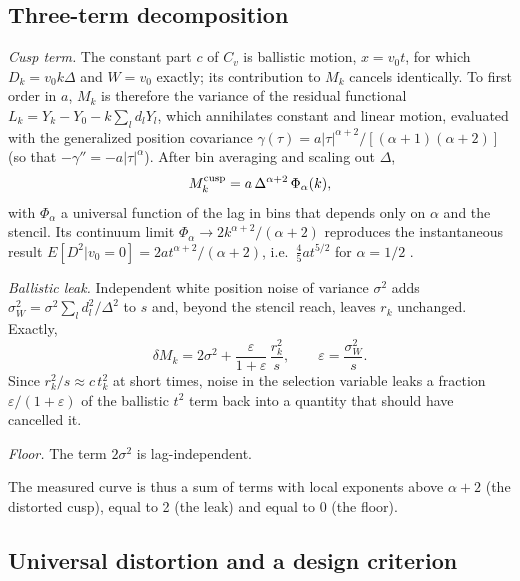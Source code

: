 \documentclass[aps,pre,10pt,twocolumn,superscriptaddress,amsmath,amssymb]{revtex4-2}
\begin{document}
\subsection{Three-term decomposition}

\emph{Cusp term.} The constant part $c$ of $C_v$ is ballistic motion, $x=v_0t$, for which $D_k=v_0k\Delta$ and $W=v_0$ exactly; its contribution to $M_k$ cancels identically. To first order in $a$, $M_k$ is therefore the variance of the residual functional $L_k=Y_k-Y_0-k\sum_l d_lY_l$, which annihilates constant and linear motion, evaluated with the generalized position covariance $\gamma(\tau)=a|\tau|^{\alpha+2}/[(\alpha+1)(\alpha+2)]$ (so that $-\gamma''=-a|\tau|^\alpha$). After bin averaging and scaling out $\Delta$,
\begin{equation}
M_k^{\rm cusp}=a\,\Delta^{\alpha+2}\,\Phi_\alpha(k),
\end{equation}
with $\Phi_\alpha$ a universal function of the lag in bins that depends only on $\alpha$ and the stencil. Its continuum limit $\Phi_\alpha\to 2k^{\alpha+2}/(\alpha+2)$ reproduces the instantaneous result $E[D^2|v_0=0]=2at^{\alpha+2}/(\alpha+2)$, i.e.\ $\tfrac45 a t^{5/2}$ for $\alpha=1/2$ \cite{Boynewicz2026}.

\emph{Ballistic leak.} Independent white position noise of variance $\sigma^2$ adds $\sigma_W^2=\sigma^2\sum_l d_l^2/\Delta^2$ to $s$ and, beyond the stencil reach, leaves $r_k$ unchanged. Exactly,
\begin{equation}
\delta M_k=2\sigma^2+\frac{\varepsilon}{1+\varepsilon}\,\frac{r_k^2}{s},\qquad \varepsilon=\frac{\sigma_W^2}{s}.
\end{equation}
Since $r_k^2/s\approx c\,t_k^2$ at short times, noise in the selection variable leaks a fraction $\varepsilon/(1+\varepsilon)$ of the ballistic $t^2$ term back into a quantity that should have cancelled it.

\emph{Floor.} The term $2\sigma^2$ is lag-independent.

The measured curve is thus a sum of terms with local exponents above $\alpha+2$ (the distorted cusp), equal to 2 (the leak) and equal to 0 (the floor).

\subsection{Universal distortion and a design criterion}
\end{document}
